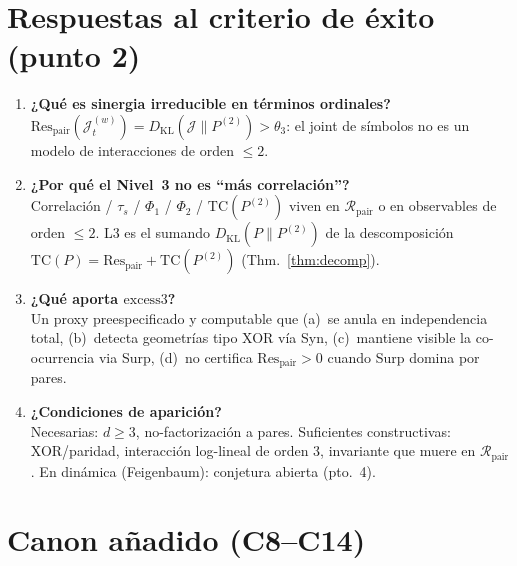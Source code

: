 \documentclass[11pt,a4paper]{article}
\theoremstyle{definition}
\theoremstyle{plain}
\theoremstyle{remark}
\newcommand{\Res}{\mathrm{Res}}
\newcommand{\TC}{\mathrm{TC}}
\newcommand{\excess}{\mathrm{excess3}}
\newcommand{\Rpair}{\mathcal{R}_{\mathrm{pair}}}
\newcommand{\Jwin}{\mathcal{J}}
\newcommand{\KL}{D_{\mathrm{KL}}}
\begin{document}
\section{Respuestas al criterio de \'exito (punto 2)}
\label{sec:answers}

\begin{enumerate}[label=\textbf{Q\arabic*.}, leftmargin=*]
  \item \textbf{¿Qu\'e es sinergia irreducible en t\'erminos ordinales?}\\
  $\Res_{\mathrm{pair}}(\Jwin_t^{(w)})=\KL(\Jwin\|P^{(2)})>\theta_3$:
  el joint de s\'imbolos no es un modelo de interacciones de orden
  $\le 2$.

  \item \textbf{¿Por qu\'e el Nivel~3 no es ``m\'as correlaci\'on''?}\\
  Correlaci\'on / $\tau_s$ / $\Phi_1$ / $\Phi_2$ / $\TC(P^{(2)})$ viven
  en $\Rpair$ o en observables de orden $\le 2$. L3 es el sumando
  $\KL(P\|P^{(2)})$ de la descomposici\'on
  $\TC(P)=\Res_{\mathrm{pair}}+\TC(P^{(2)})$ (Thm.~\ref{thm:decomp}).

  \item \textbf{¿Qu\'e aporta $\excess$?}\\
  Un proxy preespecificado y computable que (a)~se anula en independencia
  total, (b)~detecta geometr\'ias tipo XOR v\'ia Syn, (c)~mantiene visible
  la co-ocurrencia via Surp, (d)~no certifica $\Res_{\mathrm{pair}}>0$ cuando
  Surp domina por pares.

  \item \textbf{¿Condiciones de aparici\'on?}\\
  Necesarias: $d\ge 3$, no-factorizaci\'on a pares.
  Suficientes constructivas: XOR/paridad, interacci\'on log-lineal de
  orden 3, invariante que muere en $\Rpair$.
  En din\'amica (Feigenbaum): conjetura abierta (pto.~4).
\end{enumerate}

\section{Canon a\~nadido (C8--C14)}
\label{sec:canon}
\end{document}
